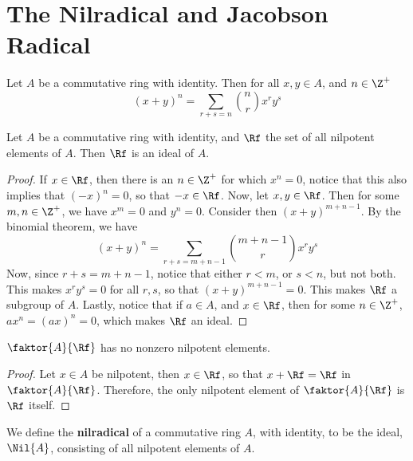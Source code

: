 \section{The Nilradical and Jacobson Radical}

\begin{theorem}\label{1.5.1}
    Let $A$ be a commutative ring with identity. Then for all  $x,y \in A$, and
     $n \in \Z^+$
     \begin{equation*}
         (x+y)^n=\sum_{r+s=n}{{n \choose r}x^ry^s}
     \end{equation*}
\end{theorem}

\begin{lemma}\label{1.5.2}
    Let $A$ be a commutative ring with identity, and $\Rf$ the set of all
    nilpotent elements of $A$. Then $\Rf$ is an ideal of $A$.
\end{lemma}
\begin{proof}
    If $x \in \Rf$, then there is an  $n \in \Z^+$ for which  $x^n=0$, notice
    that this also implies that  $(-x)^n=0$, so that $-x \in \Rf$. Now, let $x,y
    \in \Rf$. Then for some $m,n \in \Z^+$, we have $x^m=0$ and $y^n=0$.
    Consider then $(x+y)^{m+n-1}$. By the binomial theorem, we have
     \begin{equation*}
         (x+y)^n=\sum_{r+s=m+n-1}{{m+n-1 \choose r}x^ry^s}
     \end{equation*}
     Now, since $r+s=m+n-1$, notice that either  $r<m$, or  $s<n$, but not both.
     This makes  $x^ry^s=0$ for all  $r,s$, so that  $(x+y)^{m+n-1}=0$. This
     makes $\Rf$ a subgroup of  $A$. Lastly, notice that if  $a \in A$, and  $x
     \in \Rf$, then for some  $n \in \Z^+$,  $ax^n=(ax)^n=0$, which makes $\Rf$
     an ideal.
\end{proof}
\begin{corollary}
    $\faktor{A}{\Rf}$ has no nonzero nilpotent elements.
\end{corollary}
\begin{proof}
    Let $x \in A$ be nilpotent, then $x \in \Rf$, so that $x+\Rf=\Rf$ in
    $\faktor{A}{\Rf}$. Therefore, the only nilpotent element of
    $\faktor{A}{\Rf}$ is $\Rf$ itself.
\end{proof}

\begin{definition}
    We define the \textbf{nilradical} of a commutative ring $A$, with identity,
    to be the ideal, $\Nil{A}$, consisting of all nilpotent elements of $A$.
\end{definition}

